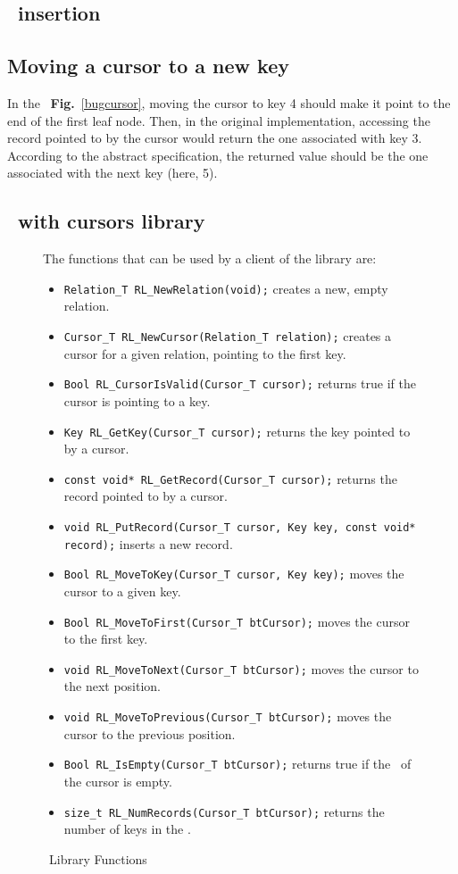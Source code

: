 \subsection{\btree\ insertion}
\afterinsert

\subsection{Moving a cursor to a new key}
\label{subsec:bug}
\bugcursor
In the \btree\ \textbf{Fig.}~\ref{bugcursor}, moving the cursor to key 4 should make it point to the end of the first leaf node.
Then, in the original implementation, accessing the record pointed to by the cursor would return the one associated with key 3.
According to the abstract specification, the returned value should be the one associated with the next key (here, 5).

\newpage
\subsection{\btrees\ with cursors library}

\begin{figure}
  The functions that can be used by a client of the library are:
  \begin{itemize}
  \item \lstinline{Relation_T RL_NewRelation(void);}  creates a new, empty relation.
  \item \lstinline{Cursor_T RL_NewCursor(Relation_T relation);}  creates a cursor for a given relation, pointing to the first key.
  \item \lstinline{Bool RL_CursorIsValid(Cursor_T cursor);}  returns true if the cursor is pointing to a key.
  \item \lstinline{Key RL_GetKey(Cursor_T cursor);}  returns the key pointed to by a cursor.
  \item \lstinline{const void* RL_GetRecord(Cursor_T cursor);}  returns the record pointed to by a cursor.
  \item \lstinline{void RL_PutRecord(Cursor_T cursor, Key key, const void* record);}  inserts a new record.
  \item \lstinline{Bool RL_MoveToKey(Cursor_T cursor, Key key);}  moves the cursor to a given key.
  \item \lstinline{Bool RL_MoveToFirst(Cursor_T btCursor);}  moves the cursor to the first key.
  \item \lstinline{void RL_MoveToNext(Cursor_T btCursor);}  moves the cursor to the next position.
  \item \lstinline{void RL_MoveToPrevious(Cursor_T btCursor);}  moves the cursor to the previous position.
  \item \lstinline{Bool RL_IsEmpty(Cursor_T btCursor);}  returns true if the \btree\ of the cursor is empty.
  \item \lstinline{size_t RL_NumRecords(Cursor_T btCursor);}  returns the number of keys in the \btree.
  \end{itemize}
  \caption{\btrees\ Library Functions}
  \label{header}
\end{figure}
\newpage
